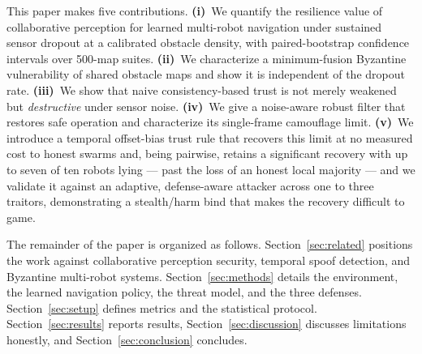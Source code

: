 This paper makes five contributions. \textbf{(i)}~We quantify the
resilience value of collaborative perception for learned multi-robot
navigation under sustained sensor dropout at a calibrated obstacle density,
with paired-bootstrap confidence intervals over 500-map suites.
\textbf{(ii)}~We characterize a minimum-fusion Byzantine vulnerability of
shared obstacle maps and show it is independent of the dropout rate.
\textbf{(iii)}~We show that naive consistency-based trust is not merely
weakened but \emph{destructive} under sensor noise. \textbf{(iv)}~We give a
noise-aware robust filter that restores safe operation and characterize its
single-frame camouflage limit. \textbf{(v)}~We introduce a temporal
offset-bias trust rule that recovers this limit at no measured cost to
honest swarms and, being pairwise, retains a significant recovery with up to
seven of ten robots lying --- past the loss of an honest local majority ---
and we validate it against an adaptive, defense-aware attacker
across one to three traitors, demonstrating a stealth/harm bind that makes
the recovery difficult to game.

The remainder of the paper is organized as follows.
Section~\ref{sec:related} positions the work against collaborative
perception security, temporal spoof detection, and Byzantine multi-robot
systems. Section~\ref{sec:methods} details the environment, the learned
navigation policy, the threat model, and the three defenses.
Section~\ref{sec:setup} defines metrics and the statistical protocol.
Section~\ref{sec:results} reports results, Section~\ref{sec:discussion}
discusses limitations honestly, and Section~\ref{sec:conclusion} concludes.

